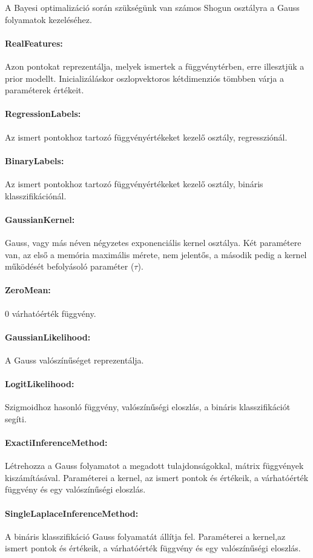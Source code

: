 A Bayesi optimalizáció során szükségünk van számos Shogun osztályra a Gauss folyamatok kezeléséhez.
\paragraph{RealFeatures:}
Azon pontokat reprezentálja, melyek ismertek a függvénytérben, erre illesztjük a prior modellt. Inicializáláskor oszlopvektoros kétdimenziós tömbben várja a paraméterek értékeit.
\paragraph{RegressionLabels:}
Az ismert pontokhoz tartozó függvényértékeket kezelő osztály, regressziónál.
\paragraph{BinaryLabels:} 
Az ismert pontokhoz tartozó függvényértékeket kezelő osztály, bináris klasszifikációnál.
\paragraph{GaussianKernel:}
Gauss, vagy más néven négyzetes exponenciális kernel osztálya. Két paramétere van, az első a memória maximális mérete, nem jelentős, a második pedig a kernel működését befolyásoló paraméter ($\tau$).
\paragraph{ZeroMean:}
0 várhatóérték függvény.
\paragraph{GaussianLikelihood:}
A Gauss valószínűséget reprezentálja.
\paragraph{LogitLikelihood:}
Szigmoidhoz hasonló függvény, valószínűségi eloszlás, a bináris klasszifikációt segíti.
\paragraph{ExactiInferenceMethod:}
Létrehozza a Gauss folyamatot a megadott tulajdonságokkal, mátrix függvények kiszámításával. Paraméterei a kernel, az ismert pontok és értékeik, a várhatóérték függvény és egy valószínűségi eloszlás. 
\paragraph{SingleLaplaceInferenceMethod:}
A bináris klasszifikáció Gauss folyamatát állítja fel. Paraméterei a kernel,az ismert pontok és értékeik, a várhatóérték függvény és egy valószínűségi eloszlás.
